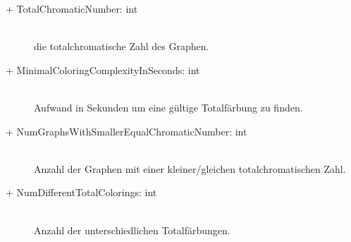 \documentclass[13pt]{scrreprt}
\begin{document}
\begin{itemize}[label = {$\circ$}]
\begin{description}
			\item [+ TotalChromaticNumber: int] \hfill \\ die totalchromatische Zahl des Graphen.
			\item [+ MinimalColoringComplexityInSeconds: int] \hfill \\ Aufwand in Sekunden um eine gültige Totalfärbung zu finden.
			\item [+ NumGraphsWithSmallerEqualChromaticNumber: int] \hfill \\ Anzahl der Graphen mit einer kleiner/gleichen totalchromatischen Zahl.
			\item [+ NumDifferentTotalColorings: int] \hfill \\ Anzahl der unterschiedlichen Totalfärbungen.
		\end{description}
	\end{itemize}
	
\end{document}
